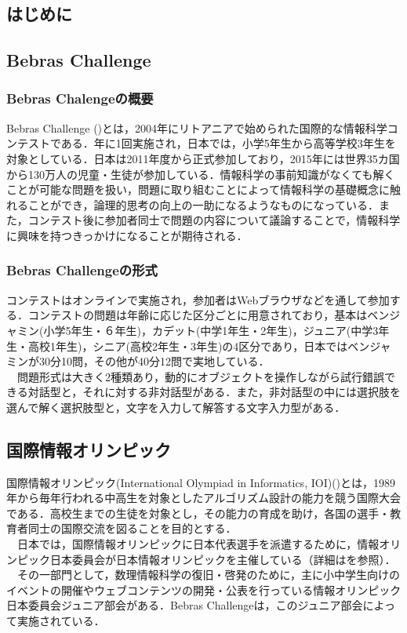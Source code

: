 \documentclass[a4paper]{jarticle}
\begin{document}
\maketitle
\begin{multicols}{2}
\setcounter{page}{1}

\section{はじめに}

\subsection{Bebras Challenge}
\subsubsection{Bebras Chalengeの概要}
Bebras Challenge (\cite{bebras-contest, bebras-pdf})とは，2004年にリトアニアで始められた国際的な情報科学コンテストである．年に1回実施され，日本では，小学5年生から高等学校3年生を対象としている．日本は2011年度から正式参加しており，2015年には世界35カ国から130万人の児童・生徒が参加している．情報科学の事前知識がなくても解くことが可能な問題を扱い，問題に取り組むことによって情報科学の基礎概念に触れることができ，論理的思考の向上の一助になるようなものになっている．また，コンテスト後に参加者同士で問題の内容について議論することで，情報科学に興味を持つきっかけになることが期待される．

\subsubsection{Bebras Challengeの形式}
 コンテストはオンラインで実施され，参加者はWebブラウザなどを通して参加する．コンテストの問題は年齢に応じた区分ごとに用意されており，基本はベンジャミン(小学5年生・６年生)，カデット(中学1年生・2年生)，ジュニア(中学3年生・高校1年生)，シニア(高校2年生・3年生)の4区分であり，日本ではベンジャミンが30分10問，その他が40分12問で実地している．
\\　問題形式は大きく2種類あり，動的にオブジェクトを操作しながら試行錯誤できる対話型と，それに対する非対話型がある．また，非対話型の中には選択肢を選んで解く選択肢型と，文字を入力して解答する文字入力型がある．

\subsection{国際情報オリンピック}
国際情報オリンピック(International Olympiad in Informatics, IOI)(\cite{ioi})とは，1989年から毎年行われる中高生を対象としたアルゴリズム設計の能力を競う国際大会である．高校生までの生徒を対象とし，その能力の育成を助け，各国の選手・教育者同士の国際交流を図ることを目的とする．
\\　日本では，国際情報オリンピックに日本代表選手を派遣するために，情報オリンピック日本委員会が日本情報オリンピックを主催している（詳細は\cite{joi}を参照）．
\\　その一部門として，数理情報科学の復旧・啓発のために，主に小中学生向けのイベントの開催やウェブコンテンツの開発・公表を行っている情報オリンピック日本委員会ジュニア部会がある．Bebras Challengeは，このジュニア部会によって実施されている．



\end{multicols}
\end{document}
